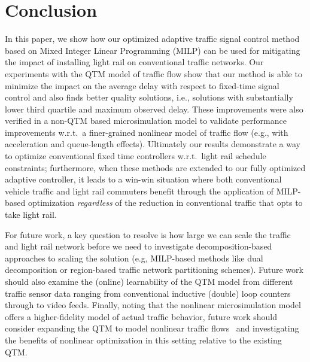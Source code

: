 \section{Conclusion}

In this paper, we show how our optimized adaptive traffic signal
control method based on Mixed Integer Linear Programming (MILP) can be
used for mitigating the impact of installing light rail on
conventional traffic networks.  Our experiments with the QTM model of
traffic flow show that our method is able to minimize the impact on
the average delay with respect to fixed-time signal control and also
finds better quality solutions, i.e., solutions with substantially
lower third quartile and maximum observed delay.  These improvements
were also verified in a non-QTM based microsimulation model to
validate performance improvements w.r.t.\ a finer-grained nonlinear
model of traffic flow (e.g., with acceleration and queue-length
effects).
%
%
Ultimately our results demonstrate a way to optimize conventional
fixed time controllers w.r.t.\ light rail schedule constraints;
furthermore, when these methods are extended to our fully optimized
adaptive controller, it leads to a win-win situation where both
conventional vehicle traffic and light rail commuters benefit through
the application of MILP-based optimization \emph{regardless} of the
reduction in conventional traffic that opts to take light rail.

For future work, a key question to resolve is how large we can scale
the traffic and light rail network before we need to investigate
decomposition-based approaches to scaling the solution 
(e.g, 
MILP-based methods like dual decomposition or region-based
traffic network partitioning schemes).
Future
work should also examine the (online) learnability of the QTM model
from different traffic sensor data ranging from conventional inductive
(double) loop counters through to video feeds.  Finally, noting that
the nonlinear microsimulation model offers a higher-fidelity model of actual
traffic behavior, future work should consider expanding the QTM to
model nonlinear traffic
flows~\cite{lu2011discrete,muralidharan2009freeway,kim2002online,huang2011traffic}
and investigating the benefits of nonlinear optimization in this
setting relative to the existing QTM.

